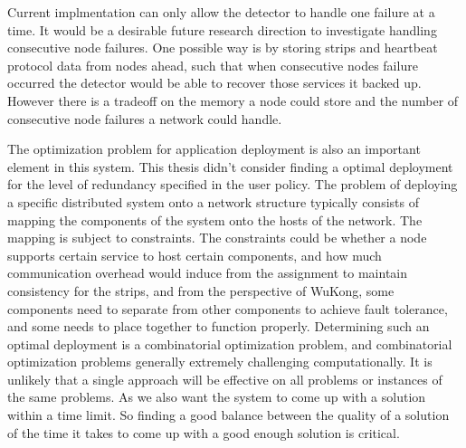 Current implmentation can only allow the detector to handle one failure at
a time. It would be a desirable future research direction to investigate
handling consecutive node failures. One possible way is by storing strips and
heartbeat protocol data from nodes ahead, such that when consecutive nodes
failure occurred the detector would be able to recover those services it backed
up.  However there is a tradeoff on the memory a node could store and the number
of consecutive node failures a network could handle.

The optimization problem for application deployment is also an important element
in this system. This thesis didn't consider finding a optimal deployment for the
level of redundancy specified in the user policy. The problem of deploying
a specific distributed system onto a network structure typically consists of
mapping the components of the system onto the hosts of the network. The mapping
is subject to constraints. The constraints could be whether a node supports
certain service to host certain components, and how much communication overhead
would induce from the assignment to maintain consistency for the strips, and
from the perspective of WuKong, some components need to separate from other
components to achieve fault tolerance, and some needs to place together to
function properly.  Determining such an optimal deployment is a combinatorial
optimization problem, and combinatorial optimization problems generally
extremely challenging computationally. It is unlikely that a single approach
will be effective on all problems or instances of the same problems. As we also
want the system to come up with a solution within a time limit. So finding
a good balance between the quality of a solution of the time it takes to come up
with a good enough solution is critical.
